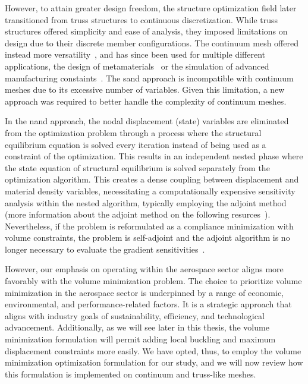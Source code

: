 However, to attain greater design freedom, the structure optimization field later transitioned from truss structures to continuous discretization. While truss structures offered simplicity and ease of analysis, they imposed limitations on design due to their discrete member configurations. The continuum mesh offered instead more versatility~, and has since been used for multiple different applications, \eg the design of metamaterials~ or the simulation of advanced manufacturing constaints~. The \gls{sand} approach is incompatible with continuum meshes due to its excessive number of variables. Given this limitation, a new approach was required to better handle the complexity of continuum meshes.

In the \acrfull{nand} approach, the nodal displacement (state) variables are eliminated from the optimization problem through a process where the structural equilibrium equation is solved every iteration instead of being used as a constraint of the optimization. This results in an independent nested phase where the state equation of structural equilibrium is solved separately from the optimization algorithm. This creates a dense coupling between displacement and material density variables, necessitating a computationally expensive sensitivity analysis within the nested algorithm, typically employing the adjoint method (more information about the adjoint method on the following resurces~). Nevertheless, if the problem is reformulated as a compliance minimization with volume constraints, the problem is self-adjoint and the adjoint algorithm is no longer necessary to evaluate the gradient sensitivities~.

However, our emphasis on operating within the aerospace sector aligns more favorably with the volume minimization problem. The choice to prioritize volume minimization in the aerospace sector is underpinned by a range of economic, environmental, and performance-related factors. It is a strategic approach that aligns with industry goals of sustainability, efficiency, and technological advancement. Additionally, as we will see later in this thesis, the volume minimization formulation will permit adding local buckling and maximum displacement constraints more easily. We have opted, thus, to employ the volume minimization optimization formulation for our study, and we will now review how this formulation is implemented on continuum and truss-like meshes.

